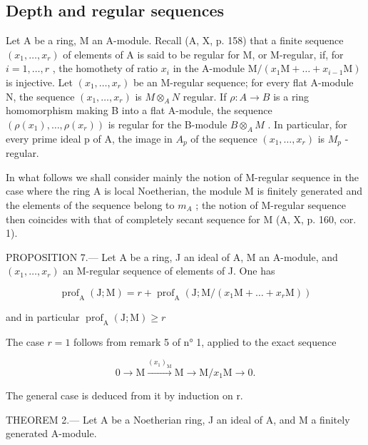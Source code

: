 \subsection{Depth and regular sequences}

Let A be a ring, M an A-module. Recall (A, X, p. 158) that a finite sequence \((x_{1},\ldots,x_{r})\) of elements of A is said to be regular for M, or M-regular, if, for \(i=1,\ldots,r\) , the homothety of ratio \(x_{i}\) in the A-module \(\mathrm{M}/(x_{1}\mathrm{M}+\ldots+x_{i-1}\mathrm{M})\) is injective. Let \((x_{1},\ldots,x_{r})\) be an M-regular sequence; for every flat A-module N, the sequence \((x_{1},\ldots,x_{r})\) is \(M\otimes_{A}N\) regular. If \(\rho:A\to B\) is a ring homomorphism making B into a flat A-module, the sequence \((\rho(x_{1}),\ldots,\rho(x_{r}))\) is regular for the B-module \(B\otimes_{A}M\) . In particular, for every prime ideal p of A, the image in \(A_{p}\) of the sequence \((x_{1},\ldots,x_{r})\) is \(M_{p}\) -regular.

In what follows we shall consider mainly the notion of M-regular sequence in the case where the ring A is local Noetherian, the module M is finitely generated and the elements of the sequence belong to \(m_{A}\) ; the notion of M-regular sequence then coincides with that of completely secant sequence for M (A, X, p. 160, cor. 1).

PROPOSITION 7.--- Let A be a ring, J an ideal of A, M an A-module, and \((x_{1},\ldots,x_{r})\) an M-regular sequence of elements of J. One has

\[
\operatorname{prof} _ {\mathrm{A}} (\mathrm{J}; \mathrm{M}) = r + \operatorname{prof} _ {\mathrm{A}} (\mathrm{J}; \mathrm{M} / (x _ {1} \mathrm{M} + \dots + x _ {r} \mathrm{M}))
\]

and in particular \(\operatorname{prof}_{\mathrm{A}}(\mathrm{J};\mathrm{M})\geqslant r\)

The case \(r=1\) follows from remark 5 of n° 1, applied to the exact sequence

\[
0 \rightarrow \mathrm{M} \xrightarrow {(x _ {1}) _ {\mathrm{M}}} \mathrm{M} \longrightarrow \mathrm{M} / x _ {1} \mathrm{M} \rightarrow 0.
\]

The general case is deduced from it by induction on r.

THEOREM 2.--- Let A be a Noetherian ring, J an ideal of A, and M a finitely generated A-module.

